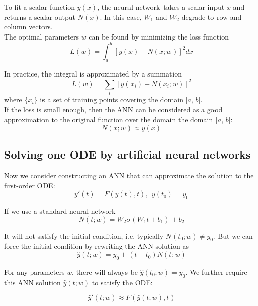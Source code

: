 \documentclass[11pt]{article}
\newcommand{\nn}{neural network}
\newcommand{\ann}{artificial neural network}
\begin{document}
To fit a scalar function $y(x)$, the \nn\ takes a scalar input $x$ and returns a scalar output $N(x)$. In this case, $W_1$ and $W_2$ degrade to row and column vectors.
\\

The optimal parameters $w$ can be found by minimizing the loss function
\begin{equation}
L(w) = \int_a^b [y(x)-N(x; w)]^2 dx
\end{equation}

In practice, the integral is approximated by a summation
\begin{equation}
L(w) = \sum_i [y(x_i)-N(x_i; w)]^2
\end{equation}
where \{$x_i$\}  is a set of training points covering the domain [$a$, $b$]. 
\\

If the loss is small enough, then the ANN can be considered as a good approximation to the original function over the domain the domain [$a$, $b$]:
\begin{equation}
N(x; w) \approx y(x)
\end{equation}

\subsection{Solving one ODE by \ann s}

Now we consider constructing an ANN that can approximate the solution to the first-order ODE:
\begin{equation}
y'(t) = F(y(t), t), \ \ y(t_0)=y_0
\end{equation}

If we use a standard \nn
\begin{equation}
N(t; w) = W_2 \sigma(W_1 t + b_1) + b_2
\end{equation}

It will not satisfy the initial condition, i.e. typically $N(t_0; w) \ne y_0$. But we can force the initial condition by rewriting the ANN solution as
\begin{equation}
\hat{y}(t; w) = y_0 + (t-t_0) N(t; w)
\end{equation}

For any parameters $w$, there will always be $\hat{y}(t_0; w) = y_0$. We further require this ANN solution $\hat{y}(t; w)$ to satisfy the ODE:

\begin{equation}
\hat{y}'(t; w) \approx F(\hat{y}(t; w), t)
\end{equation}
\end{document}

